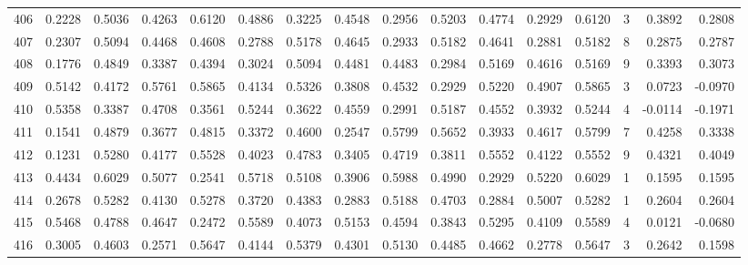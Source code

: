 \begin{tabular}{lrrrrrrrrrrrrrrr}
406 &      0.2228 &  0.5036 &  0.4263 &  0.6120 &  0.4886 &  0.3225 &  0.4548 &  0.2956 &  0.5203 &  0.4774 &   0.2929 &     0.6120 &      3 &                    0.3892 &                     0.2808 \\
407 &      0.2307 &  0.5094 &  0.4468 &  0.4608 &  0.2788 &  0.5178 &  0.4645 &  0.2933 &  0.5182 &  0.4641 &   0.2881 &     0.5182 &      8 &                    0.2875 &                     0.2787 \\
408 &      0.1776 &  0.4849 &  0.3387 &  0.4394 &  0.3024 &  0.5094 &  0.4481 &  0.4483 &  0.2984 &  0.5169 &   0.4616 &     0.5169 &      9 &                    0.3393 &                     0.3073 \\
409 &      0.5142 &  0.4172 &  0.5761 &  0.5865 &  0.4134 &  0.5326 &  0.3808 &  0.4532 &  0.2929 &  0.5220 &   0.4907 &     0.5865 &      3 &                    0.0723 &                    -0.0970 \\
410 &      0.5358 &  0.3387 &  0.4708 &  0.3561 &  0.5244 &  0.3622 &  0.4559 &  0.2991 &  0.5187 &  0.4552 &   0.3932 &     0.5244 &      4 &                   -0.0114 &                    -0.1971 \\
411 &      0.1541 &  0.4879 &  0.3677 &  0.4815 &  0.3372 &  0.4600 &  0.2547 &  0.5799 &  0.5652 &  0.3933 &   0.4617 &     0.5799 &      7 &                    0.4258 &                     0.3338 \\
412 &      0.1231 &  0.5280 &  0.4177 &  0.5528 &  0.4023 &  0.4783 &  0.3405 &  0.4719 &  0.3811 &  0.5552 &   0.4122 &     0.5552 &      9 &                    0.4321 &                     0.4049 \\
413 &      0.4434 &  0.6029 &  0.5077 &  0.2541 &  0.5718 &  0.5108 &  0.3906 &  0.5988 &  0.4990 &  0.2929 &   0.5220 &     0.6029 &      1 &                    0.1595 &                     0.1595 \\
414 &      0.2678 &  0.5282 &  0.4130 &  0.5278 &  0.3720 &  0.4383 &  0.2883 &  0.5188 &  0.4703 &  0.2884 &   0.5007 &     0.5282 &      1 &                    0.2604 &                     0.2604 \\
415 &      0.5468 &  0.4788 &  0.4647 &  0.2472 &  0.5589 &  0.4073 &  0.5153 &  0.4594 &  0.3843 &  0.5295 &   0.4109 &     0.5589 &      4 &                    0.0121 &                    -0.0680 \\
416 &      0.3005 &  0.4603 &  0.2571 &  0.5647 &  0.4144 &  0.5379 &  0.4301 &  0.5130 &  0.4485 &  0.4662 &   0.2778 &     0.5647 &      3 &                    0.2642 &                     0.1598 \\

\end{tabular}

